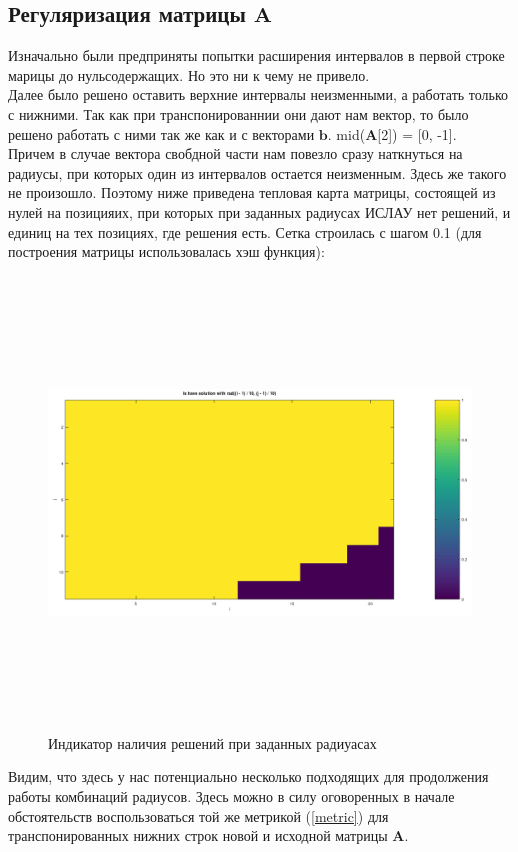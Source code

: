 \documentclass[../body.tex]{subfiles}
\begin{document}
\subsection{Регуляризация матрицы $\textbf{A}$}
Изначально были предприняты попытки расширения интервалов в первой строке марицы до нульсодержащих. Но это ни к чему не привело.
\\Далее было решено оставить верхние интервалы неизменными, а работать только с нижними. Так как при транспонированнии они дают нам вектор, то было решено работать с ними так же как и с векторами $\textbf{b}$.
mid($\textbf{A}$[2]) = [0, -1].
\\Причем в случае вектора свобдной части нам повезло сразу наткнуться на радиусы, при которых один из интервалов остается неизменным. Здесь же такого не произошло. Поэтому ниже приведена тепловая карта матрицы, состоящей из нулей на позицияих, при которых при заданных радиусах ИСЛАУ нет решений, и единиц на тех позициях, где решения есть. Сетка строилась с шагом 0.1 (для построения матрицы использовалась хэш функция):
\begin{figure}[H]
    \centering
    \includegraphics[width=16cm, height=12cm]{solution_map.png}
    \caption{Индикатор наличия решений при заданных радиуасах}
    \label{solve}
\end{figure}
Видим, что здесь у нас потенциально несколько подходящих для продолжения работы комбинаций радиусов. Здесь можно в силу оговоренных в начале обстоятельств воспользоваться той же метрикой (\ref{metric}) для транспонированных нижних строк новой и исходной матрицы $\textbf{A}$.
\end{document}
